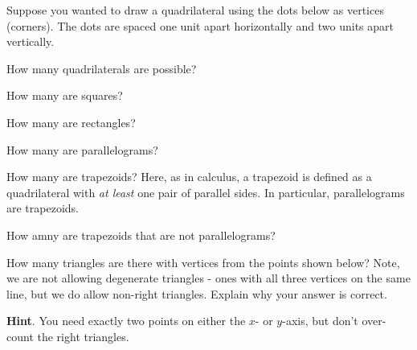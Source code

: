 \documentclass[11pt,]{book}
\theoremstyle{ptxplainnotitle}
\theoremstyle{ptxplaintitle}
\theoremstyle{ptxdefinitionnotitle}
\theoremstyle{ptxdefinitiontitle}
\theoremstyle{ptxdefinitionnotitle}
\theoremstyle{ptxdefinitiontitle}
\theoremstyle{ptxdefinitionnotitle}
\theoremstyle{ptxdefinitiontitle}
\theoremstyle{ptxdefinitiontitlenonumber}
\theoremstyle{ptxdefinitiontitlenonumber}
\numberwithin{equation}{chapter}
\begin{document}
\begin{divisionexercise}{4}\hypertarget{exercise-138}{}
\hypertarget{p-1547}{}%
Suppose you wanted to draw a quadrilateral using the dots below as vertices (corners).  The dots are spaced one unit apart horizontally and two units apart vertically.%
\begin{sidebyside}{1}{0.23}{0.23}{0}
\begin{sbspanel}{0.54}
\end{sbspanel}
\end{sidebyside}
\par\medskip
\hypertarget{p-1565}{}%
How many quadrilaterals are possible?%
\par
\hypertarget{p-1567}{}%
How many are squares?%
\par
\hypertarget{p-1569}{}%
How many are rectangles?%
\par
\hypertarget{p-1571}{}%
How many are parallelograms?%
\par
\hypertarget{p-1573}{}%
How many are trapezoids?  Here, as in calculus, a trapezoid is defined as a quadrilateral with \emph{at least} one pair of parallel sides. In particular, parallelograms are trapezoids.%
\par
\hypertarget{p-1575}{}%
How amny are trapezoids that are not parallelograms?%
\end{divisionexercise}%
\begin{divisionexercise}{5}\hypertarget{exercise-139}{}
\hypertarget{p-1582}{}%
How many triangles are there with vertices from the points shown below? Note, we are not allowing degenerate triangles - ones with all three vertices on the same line, but we do allow non-right triangles. Explain why your answer is correct.%
\begin{sidebyside}{1}{0.25}{0.25}{0}
\begin{sbspanel}{0.5}
\end{sbspanel}
\end{sidebyside}
\par\smallskip%
\noindent\textbf{Hint}.\hypertarget{hint-13}{}\quad%
\hypertarget{p-1583}{}%
You need exactly two points on either the \(x\)- or \(y\)-axis, but don't over-count the right triangles.%
\end{divisionexercise}%
\end{document}
